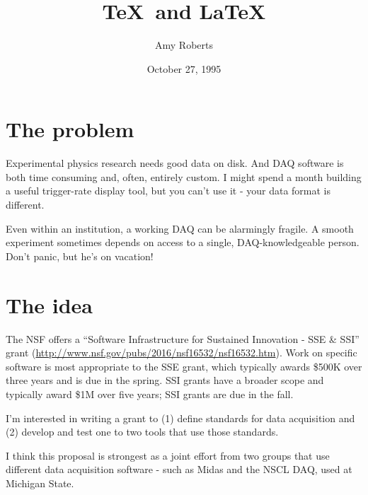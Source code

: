\documentclass[]{report}   %
\begin{document}
\title{\TeX\ and \LaTeX}   %
\author{Amy Roberts}         %
\date{October 27, 1995}    %


\section*{The problem}     %

Experimental physics research needs good data on disk.  And DAQ software is both time consuming and, often, entirely custom.  I might spend a month building a useful trigger-rate display tool, but you can't use it - your data format is different.  

Even within an institution, a working DAQ can be alarmingly fragile.  A smooth experiment sometimes depends on access to a single, DAQ-knowledgeable person.  Don't panic, but he's on vacation!  


\section*{The idea}     %
The NSF offers a ``Software Infrastructure for Sustained Innovation - SSE \& SSI'' grant
(\url{http://www.nsf.gov/pubs/2016/nsf16532/nsf16532.htm}).  Work on specific software is most appropriate to the SSE grant, which typically awards \$500K over three years and is due in the spring.  SSI grants have a broader scope and typically award \$1M over five years; SSI grants are due in the fall.

I'm interested in writing a grant to (1) define standards for data acquisition and (2) develop and test one to two tools that use those standards.  

I think this proposal is strongest as a joint effort from two groups that use different data acquisition software - such as Midas and the NSCL DAQ, used at Michigan State.
\end{document}
